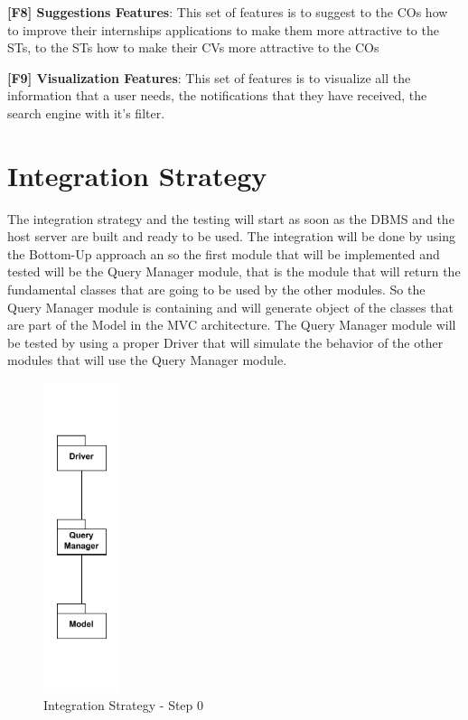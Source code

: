 \par \textbf{[F8] Suggestions Features}: This set of features is to suggest to the COs how to improve their internships
applications to make them more attractive to the STs, to the STs how to make their CVs more attractive to the COs

\par \textbf{[F9] Visualization Features}: This set of features is to visualize all the information that a user needs,
the notifications that they have received, the search engine with it's filter.


\section{Integration Strategy}
\label{sec:integration-strategy}%

\par The integration strategy and the testing will start as soon as the DBMS and the host server are built and ready 
to be used. The integration will be done by using the Bottom-Up approach an so the first module that will be implemented
and tested will be the Query Manager module, that is the module that will return the fundamental classes that are going to
be used by the other modules. So the Query Manager module is containing and will generate object of the classes that are
part of the Model in the MVC architecture. The Query Manager module will be tested by using a proper Driver that will 
simulate the behavior of the other modules that will use the Query Manager module.  

\begin{figure}[H]
    \centering
    \includegraphics[width=0.2\textwidth]{Images/Integ_0.pdf}
    \caption{Integration Strategy - Step 0}
    \label{fig:integration-strategy-step-0}
\end{figure}

